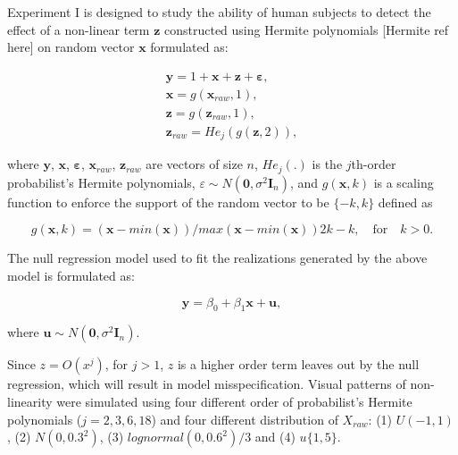 \documentclass[]{interact}
\theoremstyle{plain}%
\theoremstyle{definition}
\theoremstyle{remark}
\begin{document}
Experiment I is designed to study the ability of human subjects to
detect the effect of a non-linear term \(\boldsymbol{z}\) constructed
using Hermite polynomials {[}Hermite ref here{]} on random vector
\(\boldsymbol{x}\) formulated as:

\begin{align} \label{eq:nonlinearity-model}
\boldsymbol{y} = 1 + \boldsymbol{x} + \boldsymbol{z} + \boldsymbol{\varepsilon},\\
\boldsymbol{x} = g(\boldsymbol{x}_{raw}, 1), \\
\boldsymbol{z} = g(\boldsymbol{z}_{raw}, 1), \\
\boldsymbol{z}_{raw} = He_j(g(\boldsymbol{z}, 2)),
\end{align}

where \(\boldsymbol{y}\), \(\boldsymbol{x}\),
\(\boldsymbol{\varepsilon}\), \(\boldsymbol{x}_{raw}\),
\(\boldsymbol{z}_{raw}\) are vectors of size \(n\), \(He_{j}(.)\) is the
\(j\)th-order probabilist's Hermite polynomials,
\(\varepsilon \sim N(\boldsymbol{0}, \sigma^2\boldsymbol{I}_n)\), and
\(g(\boldsymbol{x}, k)\) is a scaling function to enforce the support of
the random vector to be \(\{-k, k\}\) defined as

\begin{equation} \label{eq:scaling-function}
g(\boldsymbol{x}, k) = (\boldsymbol{x} - min(\boldsymbol{x}))/max(\boldsymbol{x} - min(\boldsymbol{x}))2k - k, \quad \text{for} \quad k > 0. 
\end{equation}

The null regression model used to fit the realizations generated by the
above model is formulated as:

\begin{equation} \label{eq:null-model}
\boldsymbol{y} = \beta_0 + \beta_1 \boldsymbol{x} + \boldsymbol{u},
\end{equation}

where
\(\boldsymbol{u} \sim N(\boldsymbol{0}, \sigma^2\boldsymbol{I}_n)\).

Since \(z = O(x^j)\), for \(j > 1\), \(z\) is a higher order term leaves
out by the null regression, which will result in model misspecification.
Visual patterns of non-linearity were simulated using four different
order of probabilist's Hermite polynomials (\(j = 2, 3, 6, 18\)) and
four different distribution of \(X_{raw}\): (1) \(U(-1, 1)\), (2)
\(N(0, 0.3^2)\), (3) \(lognormal(0, 0.6^2)/3\) and (4) \(u\{1, 5\}\).
\end{document}
